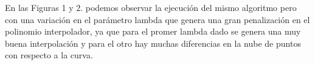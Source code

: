 \documentclass[12pt]{article}
\begin{document}
\begin{figure}[H]
	\centering
	\hfill
\end{figure}

En las Figuras 1 y 2. podemos observar la ejecución del mismo algoritmo pero con una variación en el parámetro lambda que genera una gran penalización en el polinomio interpolador, ya que para el promer lambda dado se genera una muy buena interpolación y para el otro hay muchas diferencias en la nube de puntos con respecto a la curva.

\begin{figure}[H]
	\centering
	\hfill
\end{figure}
\end{document}

